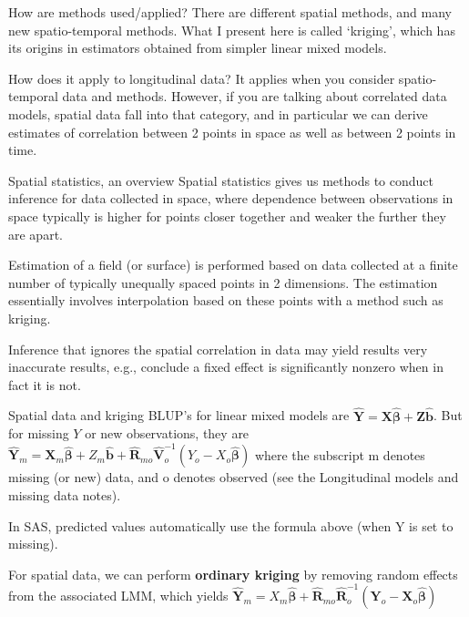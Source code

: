 \documentclass[
  9pt,
  ignorenonframetext,
]{beamer}
\begin{document}
\begin{frame}{}
\protect\hypertarget{section-9}{}
\begin{block}{How are methods used/applied?}
\protect\hypertarget{how-are-methods-usedapplied-2}{}
There are different spatial methods, and many new spatio-temporal
methods. What I present here is called `kriging', which has its origins
in estimators obtained from simpler linear mixed models.
\end{block}

\begin{block}{How does it apply to longitudinal data?}
\protect\hypertarget{how-does-it-apply-to-longitudinal-data-2}{}
It applies when you consider spatio-temporal data and methods. However,
if you are talking about correlated data models, spatial data fall into
that category, and in particular we can derive estimates of correlation
between 2 points in space as well as between 2 points in time.
\end{block}
\end{frame}

\begin{frame}{Spatial statistics, an overview}
\protect\hypertarget{spatial-statistics-an-overview}{}
Spatial statistics gives us methods to conduct inference for data
collected in space, where dependence between observations in space
typically is higher for points closer together and weaker the further
they are apart.

Estimation of a field (or surface) is performed based on data collected
at a finite number of typically unequally spaced points in 2 dimensions.
The estimation essentially involves interpolation based on these points
with a method such as kriging.

Inference that ignores the spatial correlation in data may yield results
very inaccurate results, e.g., conclude a fixed effect is significantly
nonzero when in fact it is not.
\end{frame}

\begin{frame}{Spatial data and kriging}
\protect\hypertarget{spatial-data-and-kriging}{}
BLUP's for linear mixed models are
\(\pmb {\hat Y}=\pmb X\pmb {\hat \beta}+\pmb Z\pmb {\hat b}\). But for
missing \(Y\) or new observations, they are
\(\pmb {\hat Y}_m= \pmb X_m \pmb {\hat \beta}+Z_m \pmb {\hat b}+\pmb {\hat R}_{mo} \pmb {\hat V}_o^{-1} (Y_o-X_o \pmb {\hat \beta})\)
where the subscript m denotes missing (or new) data, and o denotes
observed (see the Longitudinal models and missing data notes).

In SAS, predicted values automatically use the formula above (when Y is
set to missing).

For spatial data, we can perform \textbf{ordinary kriging} by removing
random effects from the associated LMM, which yields
\(\pmb {\hat Y}_m=X_m \pmb {\hat \beta}+\pmb {\hat R}_{mo} \pmb {\hat R}_o^{-1} (\pmb Y_o - \pmb X_o \pmb {\hat \beta})\)
\end{frame}
\end{document}
